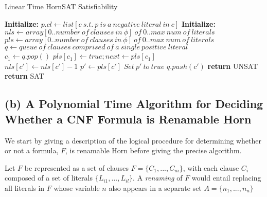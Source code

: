 \documentclass{article}
\begin{document}
\begin{algorithm}
\caption{Linear Time HornSAT Satisfiability}\label{horn}
\begin{algorithmic}[1]
            \State \textbf{Initialize:}
            \State $p.cl \gets list[c~s.t.~p~is~a~negative~literal~in~c]$
        \EndFor
        \State \textbf{Initialize:}
        \State $nls \gets array[0..number~of~clauses~in~\phi]~of~0..max~num~of~literals$
        \State $pls \gets array[0..number~of~clauses~in~\phi]~of~0..max~num~of~literals$
        \State $q \gets queue~of~clauses~comprised~of~a~single~positive~literal$
        \\
              \State $c_1 \gets q.pop()$
              \State $pls[c_1] \gets true; next \gets pls[c_1]$
              \\
               
                \State $nls[c'] \gets nls[c'] - 1$
                  \State $p' \gets pls[c']$
                      \State $Set~p'~to~true$
                      \State $q.push(c')$
                    \Else
                      \State \textbf{return} UNSAT
                    \EndIf
                  \EndIf
                \EndIf
              \EndFor
            \EndFor
        \EndWhile
        \\
        \State \textbf{return} SAT 
    \EndProcedure
\end{algorithmic}
\end{algorithm}

\subsection{\textbf{(b) A Polynomial Time Algorithm for Deciding Whether a CNF Formula is Renamable Horn}}

We start by giving a description of the logical procedure for determining whether or not a formula, $F$, is renamable Horn before giving the precise algorithm.

\bigskip
\noindent Let $F$ be represented as a set of clauses $F = \{C_1, ..., C_m\}$, with each clause $C_i$ composed of a set of literals $\{L_{i1}, ..., L_{il}\}$. A \emph{renaming} of $F$ would entail replacing all literals in $F$ whose variable $n$ also appears in a separate set $A = \{n_1, ..., n_n\}$
\end{document}
